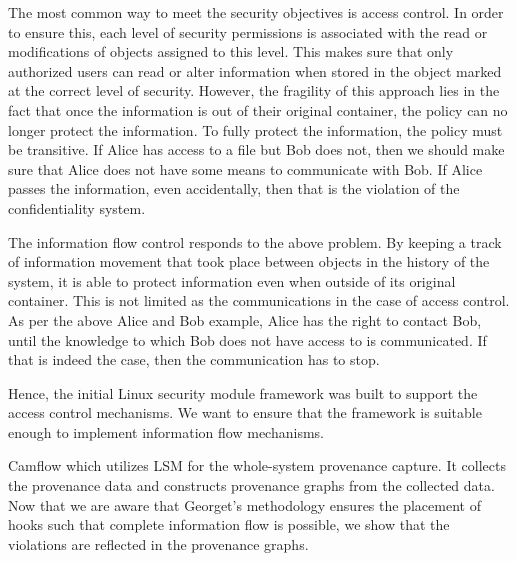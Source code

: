\vskip 0.1in
The most common way to meet the security objectives is access control. In order to ensure this, each level of security permissions is associated with the read or modifications of objects assigned to this level. This makes sure that only authorized users can read or alter information when stored in the object marked at the correct level of security. However, the fragility of this approach lies in the fact that once the information is out of their original container, the policy can no longer protect the information. To fully protect the information, the policy must be transitive. If Alice has access to a file but Bob does not, then we should make sure that Alice does not have some means to communicate with Bob. If Alice passes the information, even accidentally, then that is the violation of the confidentiality system.

\vskip 0.1in
The information flow control responds to the above problem. By keeping a track of information movement that took place between objects in the history of the system, it is able to protect information even when outside of its original container. This is not limited as the communications in the case of access control. As per the above Alice and Bob example, Alice has the right to contact Bob, until the knowledge to which Bob does not have access to is communicated. If that is indeed the case, then the communication has to stop. 

Hence, the initial Linux security module framework was built to support the access control mechanisms. We want to ensure that the framework is suitable enough to implement information flow mechanisms. 



\label{Camflow}
Camflow which utilizes LSM for the whole-system provenance capture. It collects the provenance data and constructs provenance graphs from the collected data. Now that we are aware that Georget's methodology ensures the placement of hooks such that complete information flow is possible, we show that the violations are reflected in the provenance graphs.

